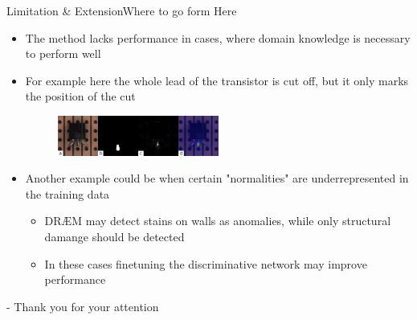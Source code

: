 \begin{frame}{Limitation \& Extension}{Where to go form Here}
    \begin{itemize}[<+->]
        \item The method lacks performance in cases, where domain knowledge is necessary to perform well
        \item For example here the whole lead of the transistor is cut off, but it only marks the position of the cut
        \begin{figure}
            \centering
            \includegraphics[width=0.5\textwidth]{pitch/transistor.png}
        \end{figure}
        \item Another example could be when certain "normalities" are underrepresented in the training data
        \begin{itemize}
            \item DRÆM may detect stains on walls as anomalies, while only structural damange should be detected
            \item In these cases finetuning the discriminative network may improve performance
        \end{itemize}
    \end{itemize}
\end{frame}

\begin{frame}[t,titleimage]{-}
    Thank you for your attention
\end{frame}